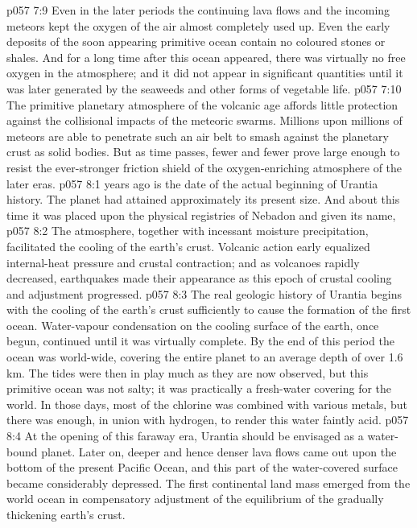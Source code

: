 \vs p057 7:9 Even in the later periods the continuing lava flows and the incoming meteors kept the oxygen of the air almost completely used up. Even the early deposits of the soon appearing primitive ocean contain no coloured stones or shales. And for a long time after this ocean appeared, there was virtually no free oxygen in the atmosphere; and it did not appear in significant quantities until it was later generated by the seaweeds and other forms of vegetable life.
\vs p057 7:10 The primitive planetary atmosphere of the volcanic age affords little protection against the collisional impacts of the meteoric swarms. Millions upon millions of meteors are able to penetrate such an air belt to smash against the planetary crust as solid bodies. But as time passes, fewer and fewer prove large enough to resist the ever\hyp{}stronger friction shield of the oxygen\hyp{}enriching atmosphere of the later eras.
\vs p057 8:1  years ago is the date of the actual beginning of Urantia history. The planet had attained approximately its present size. And about this time it was placed upon the physical registries of Nebadon and given its name, 
\vs p057 8:2 The atmosphere, together with incessant moisture precipitation, facilitated the cooling of the earth’s crust. Volcanic action early equalized internal\hyp{}heat pressure and crustal contraction; and as volcanoes rapidly decreased, earthquakes made their appearance as this epoch of crustal cooling and adjustment progressed.
\vs p057 8:3 The real geologic history of Urantia begins with the cooling of the earth’s crust sufficiently to cause the formation of the first ocean. Water\hyp{}vapour condensation on the cooling surface of the earth, once begun, continued until it was virtually complete. By the end of this period the ocean was world\hyp{}wide, covering the entire planet to an average depth of over 1.6\,km. The tides were then in play much as they are now observed, but this primitive ocean was not salty; it was practically a fresh\hyp{}water covering for the world. In those days, most of the chlorine was combined with various metals, but there was enough, in union with hydrogen, to render this water faintly acid.
\vs p057 8:4 At the opening of this faraway era, Urantia should be envisaged as a water\hyp{}bound planet. Later on, deeper and hence denser lava flows came out upon the bottom of the present Pacific Ocean, and this part of the water\hyp{}covered surface became considerably depressed. The first continental land mass emerged from the world ocean in compensatory adjustment of the equilibrium of the gradually thickening earth’s crust.

